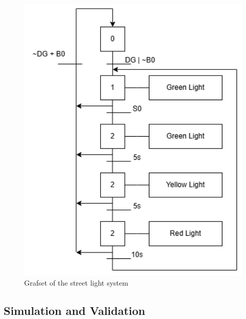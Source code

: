 \begin{figure}[H]
    \includegraphics[width=16cm]{Images/Q5/graftset.png}
    \centering
    \caption{Grafset of the street light system}
    \label{fig:grafset}
\end{figure}

\subsection{Simulation and Validation} \label{sec:Simulation_and_Validation}

